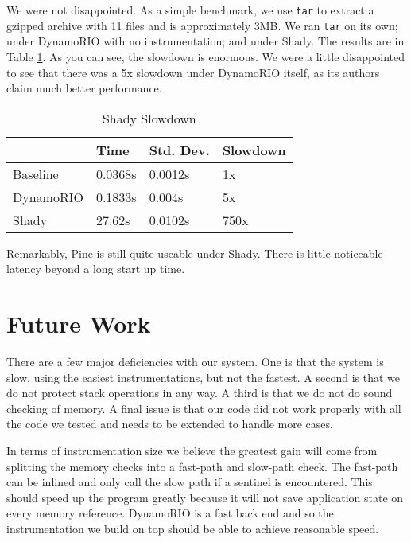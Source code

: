 \documentclass{article}
\newcommand{\code}[1]{\texttt{#1}}
\begin{document}
We were not disappointed. As a simple benchmark, we use \code{tar} to extract a gzipped archive with 11 files and is approximately 3MB. We ran \code{tar} on its own; under DynamoRIO with no instrumentation; and under Shady. The results are in Table \ref{tab:perf}. As you can see, the slowdown is enormous. We were a little disappointed to see that there was a 5x slowdown under DynamoRIO itself, as its authors claim much better performance.

\begin{table}
\caption{Shady Slowdown}
\begin{center}
\begin{tabular}{ l | l l l }
  & Time & Std. Dev. & Slowdown \\
\hline
    Baseline       &   0.0368s      &    0.0012s   & 1x \\
    DynamoRIO       &    0.1833s      &    0.004s  & 5x   \\
    Shady       &      27.62s      &    0.0102s  & 750x \\

\end{tabular}
\label{tab:perf}
\end{center}
\end{table}


Remarkably, Pine is still quite useable under Shady. There is little noticeable latency beyond a long start up time.


\section{Future Work} %
\label{sec:Future Work}

There are a few major deficiencies with our system.  One is that the system is slow, using the easiest instrumentations, but not the fastest.  A second is that we do not protect stack operations in any way.  A third is that we do not do sound checking of memory.  A final issue is that our code did not work properly with all the code we tested and needs to be extended to handle more cases.

In terms of instrumentation size we believe the greatest gain will come from splitting the memory checks into a fast-path and slow-path check.  The fast-path can be inlined and only call the slow path if a sentinel is encountered.  This should speed up the program greatly because it will not save application state on every memory reference.  DynamoRIO is a fast back end and so the instrumentation we build on top should be able to achieve reasonable speed.
\end{document}
